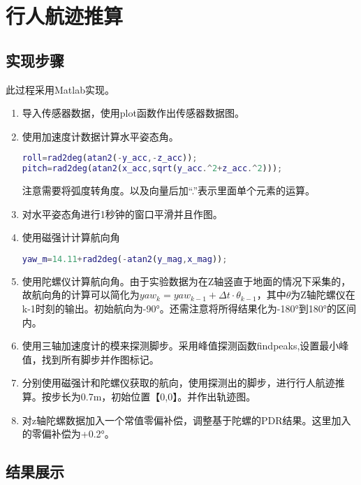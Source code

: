 \documentclass{ctexart}
\begin{document}
\section{行人航迹推算}
\subsection{实现步骤}

此过程采用Matlab实现。
\begin{enumerate}[(1)]
\item 导入传感器数据，使用plot函数作出传感器数据图。
\item 使用加速度计数据计算水平姿态角。
\begin{lstlisting}[language=Matlab]
%计算水平姿态角
roll=rad2deg(atan2(-y_acc,-z_acc));
pitch=rad2deg(atan2(x_acc,sqrt(y_acc.^2+z_acc.^2)));
\end{lstlisting}
注意需要将弧度转角度。以及向量后加“.”表示里面单个元素的运算。

\item 对水平姿态角进行1秒钟的窗口平滑并且作图。
\item 使用磁强计计算航向角
\begin{lstlisting}[language=Matlab]
%磁强计计算航向角
yaw_m=14.11+rad2deg(-atan2(y_mag,x_mag));
\end{lstlisting}
\item 使用陀螺仪计算航向角。由于实验数据为在Z轴竖直于地面的情况下采集的，故航向角的计算可以简化为$yaw_k=yaw_{k-1}+\Delta t\cdot \theta_{k-1}$，其中$\theta$为Z轴陀螺仪在k-1时刻的输出。初始航向为-90°。还需注意将所得结果化为-180°到180°的区间内。
\item 使用三轴加速度计的模来探测脚步。采用峰值探测函数findpeaks,设置最小峰值，找到所有脚步并作图标记。
\item 分别使用磁强计和陀螺仪获取的航向，使用探测出的脚步，进行行人航迹推算。按步长为0.7m，初始位置【0,0】。并作出轨迹图。
\item 对z轴陀螺数据加入一个常值零偏补偿，调整基于陀螺的PDR结果。这里加入的零偏补偿为+0.2°。
\end{enumerate}
\subsection{结果展示}
\end{document}
